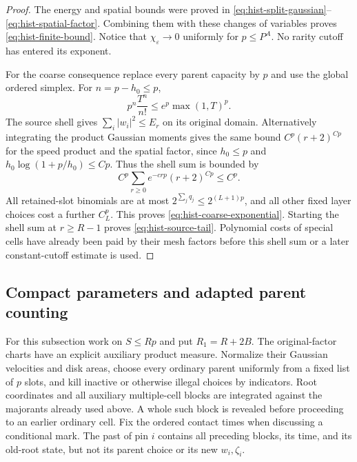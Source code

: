 \begin{proof}
The energy and spatial bounds were proved in
\eqref{eq:hist-split-gaussian}--\eqref{eq:hist-spatial-factor}.
Combining them with these changes of variables proves
\eqref{eq:hist-finite-bound}.  Notice that $\chi_\varepsilon\to0$
uniformly for $p\leq P^A$.  No rarity cutoff has entered its exponent.

For the coarse consequence replace every parent capacity by $p$ and
use the global ordered simplex.  For $n=p-h_0\leq p$,
\[
 p^n\frac{T^n}{n!}\leq e^p\max(1,T)^p.
\]
The source shell gives $\sum_i|w_i|^2\leq E_r$ on its original
domain.  Alternatively integrating the product Gaussian moments gives
the same bound $C^p(r+2)^{Cp}$ for the speed product and the spatial
factor, since $h_0\leq p$ and
$h_0\log(1+p/h_0)\leq Cp$.  Thus the shell sum is bounded by
\[
 C^p\sum_{r\geq0}e^{-c rp}(r+2)^{Cp}\leq C^p.
\]
All retained-slot binomials are at most
$2^{\sum_jq_j}\leq2^{(L+1)p}$, and all other fixed layer choices
cost a further $C_L^p$.  This proves
\eqref{eq:hist-coarse-exponential}.  Starting the shell sum at
$r\geq R-1$ proves \eqref{eq:hist-source-tail}.  Polynomial costs of
special cells have already been paid by their mesh factors before
this shell sum or a later constant-cutoff estimate is used.
\end{proof}

\subsection{Compact parameters and adapted parent counting}

For this subsection work on $S\leq Rp$ and put $R_1=R+2B$.
The original-factor charts have an explicit auxiliary product measure.
Normalize their Gaussian velocities and disk areas, choose every
ordinary parent uniformly from a fixed list of $p$ slots, and kill
inactive or otherwise illegal choices by indicators.  Root coordinates
and all auxiliary multiple-cell blocks are integrated against the
majorants already used above.  A whole such block is revealed before
proceeding to an earlier ordinary cell.  Fix the ordered contact times
when discussing a conditional mark.  The past of pin $i$ contains all
preceding blocks, its time, and its old-root state, but not its parent
choice or its new $w_i,\zeta_i$.

